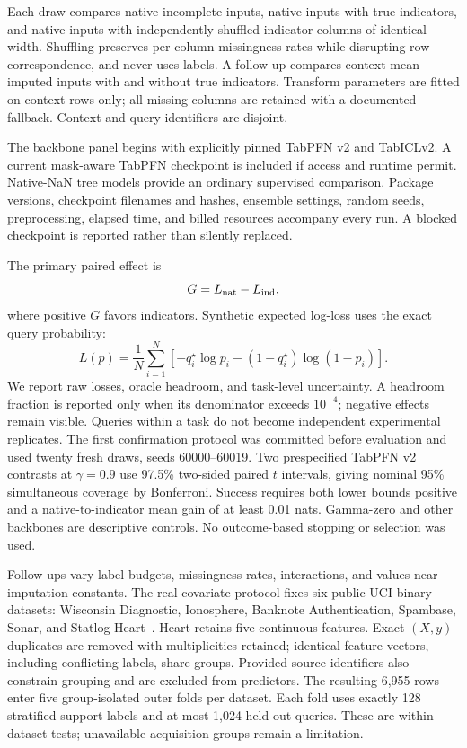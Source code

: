 \documentclass[10pt]{article}
\begin{document}
Each draw compares native incomplete inputs, native inputs with true indicators, and native inputs with independently shuffled indicator columns of identical width. Shuffling preserves per-column missingness rates while disrupting row correspondence, and never uses labels. A follow-up compares context-mean-imputed inputs with and without true indicators. Transform parameters are fitted on context rows only; all-missing columns are retained with a documented fallback. Context and query identifiers are disjoint.

The backbone panel begins with explicitly pinned TabPFN v2 and TabICLv2. A current mask-aware TabPFN checkpoint is included if access and runtime permit. Native-NaN tree models provide an ordinary supervised comparison. Package versions, checkpoint filenames and hashes, ensemble settings, random seeds, preprocessing, elapsed time, and billed resources accompany every run. A blocked checkpoint is reported rather than silently replaced.

The primary paired effect is
\begin{equation}
 G=L_{\rm nat}-L_{\rm ind},
\end{equation}
where positive $G$ favors indicators. Synthetic expected log-loss uses the exact query probability:
\begin{equation}
 L(p)=\frac{1}{N}\sum_{i=1}^{N}
 \left[-q_i^{\star}\log p_i-(1-q_i^{\star})\log(1-p_i)\right].
\end{equation}
We report raw losses, oracle headroom, and task-level uncertainty. A headroom fraction is reported only when its denominator exceeds $10^{-4}$; negative effects remain visible. Queries within a task do not become independent experimental replicates. The first confirmation protocol was committed before evaluation and used twenty fresh draws, seeds 60000--60019. Two prespecified TabPFN v2 contrasts at $\gamma=0.9$ use 97.5\% two-sided paired $t$ intervals, giving nominal 95\% simultaneous coverage by Bonferroni. Success requires both lower bounds positive and a native-to-indicator mean gain of at least 0.01 nats. Gamma-zero and other backbones are descriptive controls. No outcome-based stopping or selection was used.

Follow-ups vary label budgets, missingness rates, interactions, and values near imputation constants. The real-covariate protocol fixes six public UCI binary datasets: Wisconsin Diagnostic, Ionosphere, Banknote Authentication, Spambase, Sonar, and Statlog Heart~\cite{wdbc,ionosphere,banknote,spambase,sonar,heart}. Heart retains five continuous features. Exact $(X,y)$ duplicates are removed with multiplicities retained; identical feature vectors, including conflicting labels, share groups. Provided source identifiers also constrain grouping and are excluded from predictors. The resulting 6,955 rows enter five group-isolated outer folds per dataset. Each fold uses exactly 128 stratified support labels and at most 1,024 held-out queries. These are within-dataset tests; unavailable acquisition groups remain a limitation.
\end{document}

